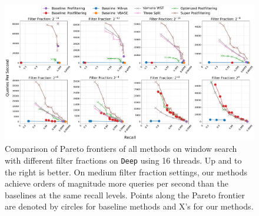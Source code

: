 \documentclass{article}
\theoremstyle{plain}
\theoremstyle{definition}
\theoremstyle{remark}
\newcommand{\josh}[1]{{\color{orange}{\bf Josh:} #1}}
\newcommand{\datasetname}[1]{\texttt{#1}}
\newcommand{\algname}[1]{\ensuremath{\mathsf{#1}}}
\begin{document}
    






\begin{figure}[t]
\begin{center}
\centerline{\includegraphics[width=16cm]{images/deep-image-96-angular_results_vamana.pdf}}
\caption{Comparison of Pareto frontiers of all methods on window search with different filter fractions on \datasetname{Deep} using 16 threads. Up and to the right is better. On medium filter fraction settings, our methods achieve orders of magnitude more queries per second than the baselines at the same recall levels. Points along the Pareto frontier are denoted by circles for baseline methods and X's for our methods.
}
\label{fig:deep_results}
\end{center}
\end{figure}
\end{document}
